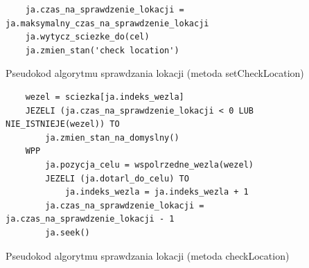\begin{table}
\begin{center}
\begin{lstlisting}
	ja.czas_na_sprawdzenie_lokacji = ja.maksymalny_czas_na_sprawdzenie_lokacji
	ja.wytycz_sciezke_do(cel)
	ja.zmien_stan('check location')
\end{lstlisting}
\caption {Pseudokod algorytmu sprawdzania lokacji (metoda setCheckLocation)}\label{checkLocationSet}
\label{attackCode}
\end{center}
\end{table}


\begin{table}
\begin{center}
\begin{lstlisting}
	wezel = sciezka[ja.indeks_wezla]
	JEZELI (ja.czas_na_sprawdzenie_lokacji < 0 LUB NIE_ISTNIEJE(wezel)) TO
		ja.zmien_stan_na_domyslny()	
	WPP
		ja.pozycja_celu = wspolrzedne_wezla(wezel)
		JEZELI (ja.dotarl_do_celu) TO
			ja.indeks_wezla = ja.indeks_wezla + 1
		ja.czas_na_sprawdzenie_lokacji = ja.czas_na_sprawdzenie_lokacji - 1
		ja.seek()	
\end{lstlisting}
\caption {Pseudokod algorytmu sprawdzania lokacji (metoda checkLocation)}\label{checkLocationDo}
\label{attackCode}
\end{center}
\end{table}
